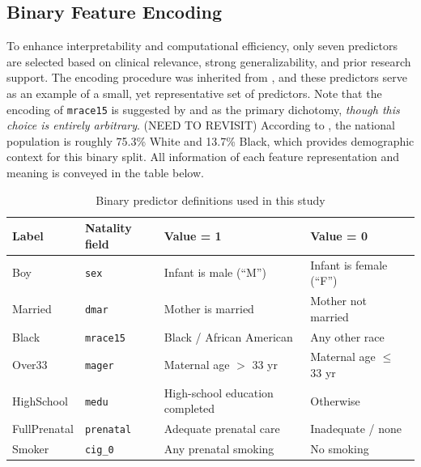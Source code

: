 \subsection{Binary Feature Encoding}
\label{sec:ch2-feature-encoding}

To enhance interpretability and computational efficiency, only seven predictors are selected based on clinical relevance, strong generalizability, and prior research support. The encoding procedure was inherited from \citet{jain2024}, and these predictors serve as an example of a small, yet representative set of predictors. Note that the encoding of \texttt{mrace15} is suggested by \citet{jain2024} and \citet{marchofdimes2024} as the primary dichotomy, \emph{though this choice is entirely arbitrary}. (NEED TO REVISIT)  According to \citeyear{census_usa} \citet{census_usa}, the national population is roughly 75.3\% White and 13.7\% Black, which provides demographic context for this binary split. All information of each feature representation and meaning is conveyed in the table below.

\begin{table}[ht]
\centering         %
\small             %
\caption[Binary Predictor Definitions Used in This Study]{Binary predictor definitions used in this study}
\begin{tabular}{@{}llll@{}}
\toprule
\textbf{Label} & \textbf{Natality field} & \textbf{Value = 1} & \textbf{Value = 0} \\ \midrule
Boy          & \texttt{sex}      & Infant is male (“M”)                     & Infant is female (“F”) \\
Married      & \texttt{dmar}     & Mother is married                        & Mother not married     \\
Black        & \texttt{mrace15}  & Black / African American                 & Any other race         \\
Over33       & \texttt{mager}    & Maternal age $>$ 33 yr                   & Maternal age $\le$ 33 yr \\
HighSchool   & \texttt{medu}     & High-school education completed          & Otherwise              \\
FullPrenatal & \texttt{prenatal} & Adequate prenatal care                   & Inadequate / none      \\
Smoker       & \texttt{cig\_0}   & Any prenatal smoking                     & No smoking             \\ \bottomrule
\end{tabular}
\end{table}

